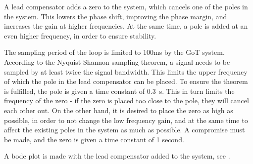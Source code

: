 A lead compensator adds a zero to the system, which cancels one of the poles in the system. This lowers the phase shift, improving the phase margin, and increases the gain at higher frequencies. At the same time, a pole is added at an even higher frequency, in order to ensure stability.

The sampling period of the loop is limited to 100ms by the GoT system. According to the Nyquist-Shannon sampling theorem, a signal needs to be sampled by at least twice the signal bandwidth. This limits the upper frequency of which the pole in the lead compensator can be placed. To ensure the theorem is fulfilled, the pole is given a time constant of \SI{0,3}{s}. This in turn limits the frequency of the zero - if the zero is placed too close to the pole, they will cancel each other out. On the other hand, it is desired to place the zero as high as possible, in order to not change the low frequency gain, and at the same time to affect the existing poles in the system as much as possible. A compromise must be made, and the zero is given a time constant of 1 second.

A bode plot is made with the lead compensator added to the system, see  . 

